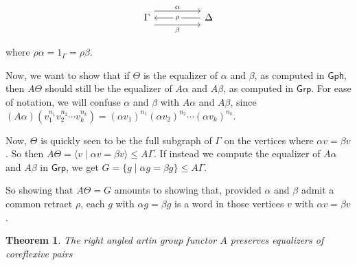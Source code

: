 \documentclass[12pt]{article}
\newtheorem{thm}{Theorem}
\theoremstyle{definition}
\theoremstyle{theorem}
\newcommand*{\catFont}[1]{\mathsf{#1}}
\newcommand{\Grp}{\catFont{Grp}}
\begin{document}
\[\begin{tikzcd}
	\Gamma && \Delta
	\arrow["\alpha", shift left=3, from=1-1, to=1-3]
	\arrow["\beta"', shift right=3, from=1-1, to=1-3]
	\arrow["\rho"{description}, from=1-3, to=1-1]
\end{tikzcd}\]

where $\rho \alpha = 1_\Gamma = \rho \beta$.

Now, we want to show that if $\Theta$ is the equalizer of $\alpha$ and $\beta$,
as computed in $\mathsf{Gph}$, 
then $A\Theta$ should still be the equalizer of $A \alpha$ and $A \beta$, 
as computed in $\mathsf{Grp}$.
For ease of notation, we will confuse $\alpha$ and $\beta$ with $A \alpha$
and $A \beta$, since 
$(A\alpha)(v_1^{n_1} v_2^{n_2} \cdots v_k^{n_k}) = (\alpha v_1)^{n_1} (\alpha v_2)^{n_2} \cdots (\alpha v_k)^{n_k}$.

Now, $\Theta$ is quickly seen to be the full subgraph of $\Gamma$
on the vertices where $\alpha v = \beta v$. 
So then $A\Theta = \langle v \mid \alpha v = \beta v \rangle \leq A \Gamma$.
If instead we compute the equalizer of $A \alpha$ and $A \beta$ in $\Grp$,
we get $G = \{ g \mid \alpha g = \beta g \} \leq A\Gamma$.

So showing that $A \Theta = G$ amounts to showing that, provided $\alpha$ 
and $\beta$ admit a common retract $\rho$, each $g$ 
with $\alpha g = \beta g$ is a word in those vertices $v$ with $\alpha v = \beta v$.

\begin{thm}
    The right angled artin group functor $A$ preserves equalizers of coreflexive pairs
\end{thm}
\end{document}
